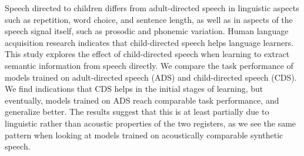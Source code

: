 Speech directed to children differs from adult-directed speech in linguistic aspects such as repetition, word choice, and sentence length, as well as in aspects of the speech signal itself, such as prosodic and phonemic variation. Human language acquisition research indicates that child-directed speech helps language learners. This study explores the effect of child-directed speech when learning to extract semantic information from speech directly. We compare the task performance of models trained on adult-directed speech (ADS) and child-directed speech (CDS). We find indications that CDS helps in the initial stages of learning, but eventually, models trained on ADS reach comparable task performance, and generalize better. The results suggest that this is at least partially due to linguistic rather than acoustic properties of the two registers, as we see the same pattern when looking at models trained on acoustically comparable synthetic speech.
